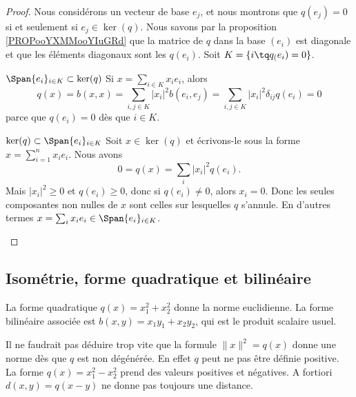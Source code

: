 \begin{proof}
	Nous considérons un vecteur de base \( e_j\), et nous montrons que \( q(e_j)=0\) si et seulement si \( e_j\in\ker(q)\). Nous savons par la proposition \ref{PROPooYXMMooYIuGRd} que la matrice de \( q\) dans la base \( (e_i)\) est diagonale et que les éléments diagonaux sont les \( q(e_i)\). Soit \( K=\{ i\tq q_(e_i)=0 \}\).
	\begin{subproof}
		\item[\( \Span\{ e_i \}_{i\in K}\subset\ker(q)\)]
		Si \( x=\sum_{i\in K}x_ie_i\), alors
		\begin{equation}
			q(x)=b(x,x)=\sum_{i,j\in K}| x_i |^2b(e_i,e_j)=\sum_{i,j\in K}| x_i |^2\delta_{ij}q(e_i)=0
		\end{equation}
		parce que \( q(e_i)=0\) dès que \( i\in K\).
		\item{\( \ker(q)\subset\Span\{ e_i \}_{i\in K}\)}
		Soit \( x\in \ker(q)\) et écrivons-le sous la forme \( x=\sum_{i=1}^nx_ie_i\). Nous avons
		\begin{equation}
			0=q(x)=\sum_i| x_i |^2q(e_i).
		\end{equation}
		Mais \(    | x_i |^2\geq 0 \) et \( q(e_i)\geq 0\), donc si \( q(e_i)\neq 0\), alors \( x_i=0\). Donc les seules composantes non nulles de \( x\) sont celles sur lesquelles \( q\) s'annule. En d'autres termes \( x=\sum_ix_ie_i\in \Span\{ e_i \}_{i\in K}\).
	\end{subproof}
\end{proof}

\subsection{Isométrie, forme quadratique et bilinéaire}

\begin{example}
	La forme quadratique \( q(x)=x_1^2+x_2^2\) donne la norme euclidienne. La forme bilinéaire associée est \( b(x,y)=x_1y_1+x_2y_2\), qui est le produit scalaire usuel.
\end{example}

Il ne faudrait pas déduire trop vite que la formule \( \| x \|^2=q(x)\) donne une norme dès que \( q\) est non dégénérée. En effet \( q\) peut ne pas être définie positive. La forme \( q(x)=x_1^2-x_2^2\) prend des valeurs positives et négatives. A fortiori \( d(x,y)=q(x-y)\) ne donne pas toujours une distance.

